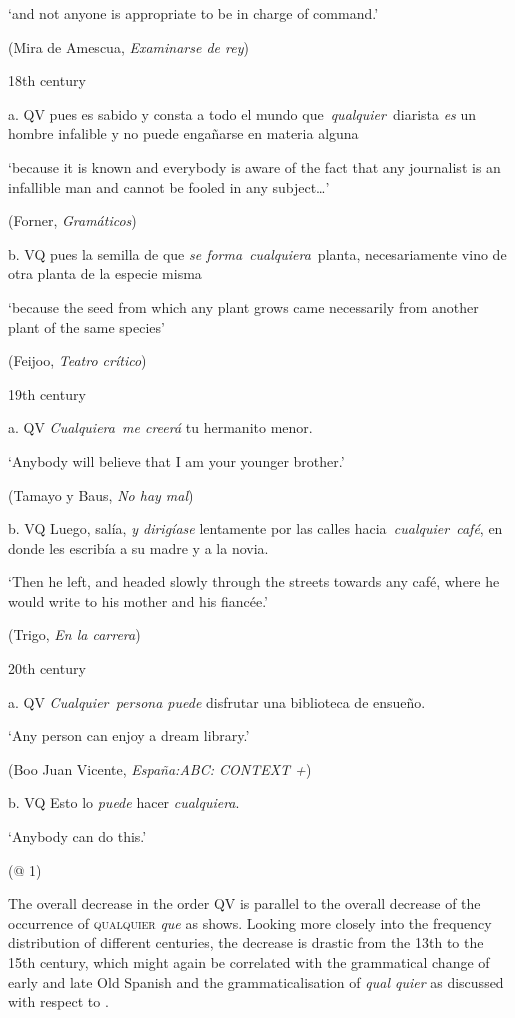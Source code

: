       ‘and not anyone is appropriate to be in charge of command.’

      (Mira de Amescua, \textit{Examinarse de rey})

  18th century

  a.  QV  pues es sabido y consta a todo el mundo que~\textit{qualquier}~diarista \textit{es} un hombre infalible y no puede engañarse en materia alguna 

      ‘because it is known and everybody is aware of the fact that any journalist is an infallible man and cannot be fooled in any subject…’

      (Forner, \textit{Gramáticos})

  b.  VQ  pues la semilla de que \textit{se forma}~\textit{cualquiera}~planta, necesariamente vino de otra planta de la especie misma 

      ‘because the seed from which any plant grows came necessarily from another plant of the same species’

      (Feijoo, \textit{Teatro crítico})

  19th century

  a.  QV  \textit{Cualquiera~me creerá} tu hermanito menor. 

      ‘Anybody will believe that I am your younger brother.’

      (Tamayo y Baus, \textit{No hay mal})

  b.  VQ  Luego, salía, \textit{y dirigíase} lentamente por las calles hacia\textit{~cualquier~café}, en donde les escribía a su madre y a la novia. 

      ‘Then he left, and headed slowly through the streets towards any café, where he would write to his mother and his fiancée.’

      (Trigo, \textit{En la carrera})

  20th century

  a.  QV  \textit{Cualquier~persona puede} disfrutar una biblioteca de ensueño.

      ‘Any person can enjoy a dream library.’

      (Boo Juan Vicente, \textit{España:ABC: CONTEXT +})

  b.  VQ  Esto lo \textit{puede} hacer \textit{cualquiera}. 

       ‘Anybody can do this.’

      (@ 1)

The overall decrease in the order QV is parallel to the overall decrease of the occurrence of \textsc{qualquier} \textit{que} as  shows. Looking more closely into the frequency distribution of different centuries, the decrease is drastic from the 13th to the 15th century, which might again be correlated with the grammatical change of early and late Old Spanish and the grammaticalisation of \textit{qual quier} as discussed with respect to .


